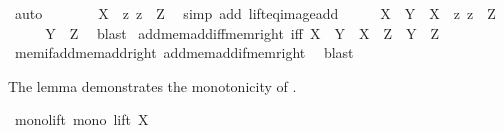 \begin{isabellebody}
\ auto\isanewline
\ \ \isamarkupfalse%
\ \isamarkupfalse%
\ {\isachardoublequoteopen}{\isachardot}{\kern0pt}{\isachardot}{\kern0pt}{\isachardot}{\kern0pt}\ {\isacharequal}{\kern0pt}\ {\isacharbraceleft}{\kern0pt}X\ {\isacharplus}{\kern0pt}\ z{\isacharbar}{\kern0pt}\ z\ {\isasymin}\ Z{\isacharbraceright}{\kern0pt}{\isachardoublequoteclose}\ \isamarkupfalse%
\ {\isacharparenleft}{\kern0pt}simp\ add{\isacharcolon}{\kern0pt}\ lift{\isacharunderscore}{\kern0pt}eq{\isacharunderscore}{\kern0pt}image{\isacharunderscore}{\kern0pt}add{\isacharparenright}{\kern0pt}\isanewline
\ \ \isamarkupfalse%
\ \isamarkupfalse%
\ {\isachardoublequoteopen}X\ {\isacharplus}{\kern0pt}\ Y\ {\isasymin}\ {\isacharbraceleft}{\kern0pt}X\ {\isacharplus}{\kern0pt}\ z{\isacharbar}{\kern0pt}\ z\ {\isasymin}\ Z{\isacharbraceright}{\kern0pt}{\isachardoublequoteclose}\ \isacommand{{\isachardot}{\kern0pt}}\isamarkupfalse%
\isanewline
\ \ \isamarkupfalse%
\ \isamarkupfalse%
\ {\isachardoublequoteopen}Y\ {\isasymin}\ Z{\isachardoublequoteclose}\ \isamarkupfalse%
\ blast\isanewline
{}\isamarkupfalse%
%
\endisatagproof
{\isafoldproof}%
%
\isadelimproof
\isanewline
%
\endisadelimproof
\isanewline
{}\isamarkupfalse%
\ add{\isacharunderscore}{\kern0pt}mem{\isacharunderscore}{\kern0pt}add{\isacharunderscore}{\kern0pt}iff{\isacharunderscore}{\kern0pt}mem{\isacharunderscore}{\kern0pt}right\ {\isacharbrackleft}{\kern0pt}iff{\isacharbrackright}{\kern0pt}{\isacharcolon}{\kern0pt}\ {\isachardoublequoteopen}X\ {\isacharplus}{\kern0pt}\ Y\ {\isasymin}\ X\ {\isacharplus}{\kern0pt}\ Z\ {\isasymlongleftrightarrow}\ Y\ {\isasymin}\ Z{\isachardoublequoteclose}\isanewline
%
\isadelimproof
\ \ %
\endisadelimproof
%
\isatagproof
{}\isamarkupfalse%
\ mem{\isacharunderscore}{\kern0pt}if{\isacharunderscore}{\kern0pt}add{\isacharunderscore}{\kern0pt}mem{\isacharunderscore}{\kern0pt}add{\isacharunderscore}{\kern0pt}right\ add{\isacharunderscore}{\kern0pt}mem{\isacharunderscore}{\kern0pt}add{\isacharunderscore}{\kern0pt}if{\isacharunderscore}{\kern0pt}mem{\isacharunderscore}{\kern0pt}right\ \isamarkupfalse%
\ blast%
\endisatagproof
{\isafoldproof}%
%
\isadelimproof
%
\endisadelimproof
%
\begin{isamarkuptext}%
The lemma demonstrates the monotonicity of   .%
\end{isamarkuptext}\isamarkuptrue%
\isamarkupfalse%
\ mono{\isacharunderscore}{\kern0pt}lift{\isacharcolon}{\kern0pt}\ {\isachardoublequoteopen}mono\ {\isacharparenleft}{\kern0pt}lift\ X{\isacharparenright}{\kern0pt}{\isachardoublequoteclose}\isanewline

\end{isabellebody}
